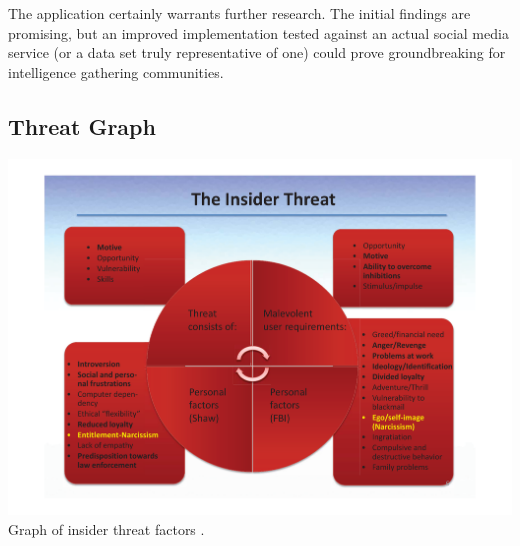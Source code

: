 \documentclass[12pt]{article}
\begin{document}
The application certainly warrants further research. The initial findings are promising, but an improved implementation tested against an actual social media service (or a data set truly representative of one) could prove groundbreaking for intelligence gathering communities.

\newpage


\newpage
\begin{appendices}
\section{Threat Graph}
\label{appendix:threatgraph}
\includegraphics[width=\linewidth]{res/threat_graph.png}
Graph of insider threat factors \citep{behaviourdetection}.


\end{appendices}
\end{document}
